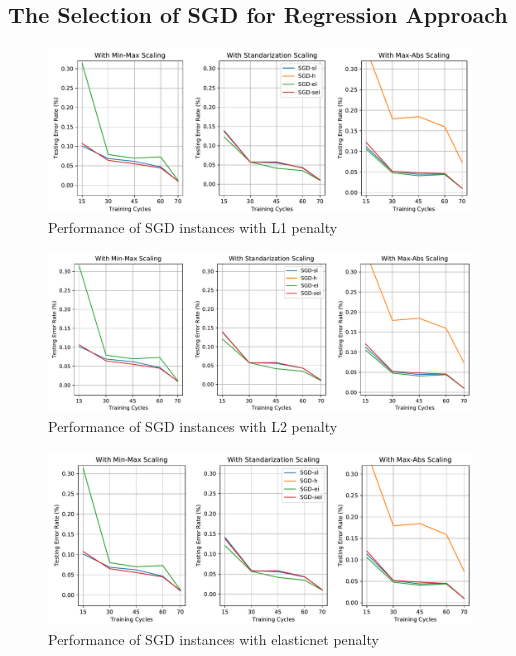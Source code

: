 \documentclass[a4paper,12pt]{article}
\begin{document}
\subsection{The Selection of SGD for Regression Approach} \label{SGDRegressorsTests}
\begin{figure}[H]
	\centering
	\includegraphics[keepaspectratio, width=\linewidth]{graphs/SGDRegressorsWithPenaltyL1.pdf}
	\caption{Performance of SGD instances with L1 penalty}
	\label{SGDRL1}
\end{figure}
\begin{figure}[H]
	\centering
	\includegraphics[keepaspectratio, width=\linewidth]{graphs/SGDRegressorsWithPenaltyL2.pdf}
	\caption{Performance of SGD instances with L2 penalty}
	\label{SGDRL2}
\end{figure}
\begin{figure}[H]
	\centering
	\includegraphics[keepaspectratio, width=\linewidth]{graphs/SGDRegressorsWithPenaltyElasticnet.pdf}
	\caption{Performance of SGD instances with elasticnet penalty}
	\label{SGDRElasticnet}
\end{figure}
\end{document}
